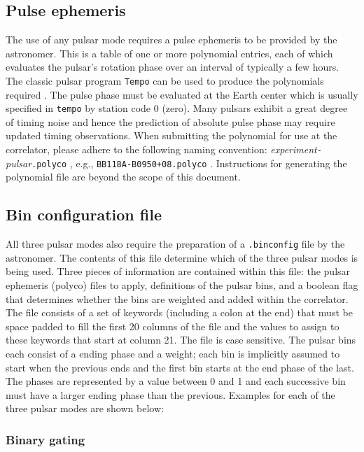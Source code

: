 \subsection{Pulse ephemeris}

The use of any pulsar mode requires a pulse ephemeris to be provided by the astronomer.  
This is a table of one or more polynomial entries, each of which evaluates the pulsar's rotation phase over an interval of typically a few hours.
The classic pulsar program {\tt Tempo} can be used to produce the polynomials required \cite{tempo}.
The pulse phase must be evaluated at the Earth center which is usually specified in {\tt tempo} by station code 0 (zero).
Many pulsars exhibit a great degree of timing noise and hence the prediction of absolute pulse phase may require updated timing observations.
When submitting the polynomial for use at the correlator, please adhere to the following naming convention: {\em experiment}{\tt -}{\em pulsar}{\tt .polyco} , e.g., {\tt BB118A-B0950+08.polyco} .
Instructions for generating the polynomial file are beyond the scope of this document.

\subsection{Bin configuration file}

All three pulsar modes also require the preparation of a {\tt .binconfig} file by the astronomer.
The contents of this file determine which of the three pulsar modes is being used.
Three pieces of information are contained within this file: the pulsar ephemeris (polyco) files to apply, definitions of the pulsar bins, and a boolean flag that determines whether the bins are weighted and added within the correlator.
The file consists of a set of keywords (including a colon at the end) that must be space padded to fill the first 20 columns of the file and the values to assign
to these keywords that start at column 21.
The file is case sensitive.
The pulsar bins each consist of a ending phase and a weight; each bin is implicitly assumed to start when the previous ends and the first bin starts at the end phase of the last.
The phases are represented by a value between 0 and 1 and each successive bin must have a larger ending phase than the previous.
Examples for each of the three pulsar modes are shown below:

\subsubsection{Binary gating}

